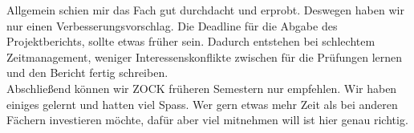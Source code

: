\documentclass[12pt,a4paper,bibliography=totocnumbered,listof=totocnumbered]{scrartcl}
\begin{document}
	Allgemein schien mir das Fach gut durchdacht und erprobt. Deswegen haben wir nur einen Verbesserungsvorschlag. Die Deadline für die Abgabe des Projektberichts, sollte etwas früher sein. Dadurch entstehen bei schlechtem Zeitmanagement, weniger Interessenskonflikte zwischen für die Prüfungen lernen und den Bericht fertig schreiben.\\
	Abschließend können wir \glqq ZOCK \grqq{} früheren Semestern nur empfehlen. Wir haben einiges gelernt und hatten viel Spass. Wer gern etwas mehr Zeit als bei anderen Fächern investieren möchte, dafür aber viel mitnehmen will ist hier genau richtig.

    \newpage
\end{document}
